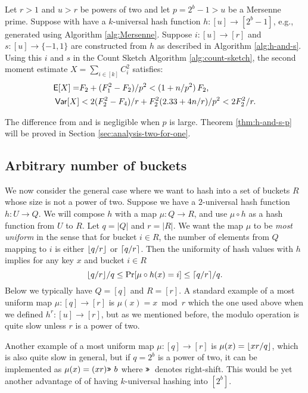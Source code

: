 \begin{theorem}\label{thm:h-and-s-p}
   Let $r>1$ and $u>r$ be powers of two and let $p=2^b-1>u$ be a
   Mersenne prime.
   Suppose with have a $k$-universal hash function $h:[u]\to[2^b-1]$, e.g.,
   generated using Algorithm \ref{alg:Mersenne}. Suppose
   $i:[u]\to[r]$ and
   $s:[u]\to\{-1,1\}$ are constructed from $h$ as described in
   Algorithm \ref{alg:h-and-s}. Using this $i$ and $s$ 
   in the Count Sketch Algorithm \ref{alg:count-sketch}, the second moment 
   estimate $X=\sum_{i\in[k]} C_i^2$ satisfies:
   \begin{align}
      \operatorname*{\sf{E}}[X]=&F_2+(F_1^2-F_2)/p^2 < (1+n/p^2)\,F_2\textnormal,\label{eq:E-F2-p}\\
      {\sf Var}[X]&< 2(F_2^2-F_4)/r+F_2^2 (2.33+4 n/r)/p^2<2F_2^2/r.\label{eq:V-F2-p}
   \end{align}
\end{theorem}
The difference from  and  
is negligible when $p$ is large. Theorem \ref{thm:h-and-s-p} will be
proved in Section \ref{sec:analysis-two-for-one}.


\subsection{Arbitrary number of buckets}\label{sec:most-uniform}
We now consider the general case where we want to hash into a set of buckets $R$ whose size is not a power of two.
Suppose we have a $2$-universal hash function $h:U\to Q$.
We will compose $h$ with a map $\mu:Q\to R$, and use $\mu\circ h$ as a hash function from $U$ to $R$.
Let $q=|Q|$ and $r=|R|$.
We want the map $\mu$ to be \emph{most uniform} in the sense that for bucket $i\in R$, the number of elements from $Q$ mapping to $i$ is either $\lfloor {q/r} \rfloor$ or $\lceil {q/r}\rceil$.
Then the uniformity of hash values with $h$ implies for any key $x$ and bucket $i\in R$ \[\lfloor {q/r} \rfloor/q\leq \Pr[\mu\circ h(x)=i]\leq \lceil {q/r}\rceil/q.\]
Below we typically have $Q=[q]$ and $R=[r]$.
A standard example of a most uniform map $\mu:[q]\to[r]$ is $\mu(x)=x\bmod r$ which the one used above when we defined $h^r:[u]\to[r]$, but as we mentioned before, the modulo operation is quite slow unless $r$ is a power of two.

Another example of a most uniform map $\mu:[q]\to[r]$ 
is $\mu(x)=\lfloor {xr/q} \rfloor$,
which is also quite slow in general, but if $q=2^b$ is a power of two,
it can be implemented as $\mu(x)=(xr)\texttt{>>}\,\,b$ where 
$\texttt{>>}\,$ denotes right-shift. This would be yet another advantage 
of of having $k$-universal hashing into $[2^b]$.

